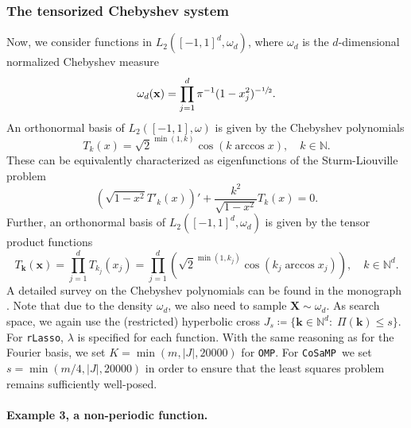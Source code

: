 \documentclass[11pt,reqno, a4paper]{article}
\numberwithin{equation}{section}
\newcommand{\N}{\mathbb{N}}
\newcommand{\rlasso}{\texttt{rLasso}}
\newcommand{\omp}{\texttt{OMP}}
\newcommand{\cosamp}{\texttt{CoSaMP}}
\begin{document}
\subsubsection{The tensorized Chebyshev system}
Now, we consider functions in $L_2([-1,1]^d, {\omega}_d)$, where $\omega_d$ is the $d$-dimensional normalized Chebyshev measure
\begin{equation}\label{prob_measure_Cheb}
\omega_d(\mathbf x) = \prod_{j=1}^d \pi^{-1}(1-x_j^2)^{-\sfrac12}.
\end{equation}
An orthonormal basis of $L_2([-1,1], {\omega})$ is given by the Chebyshev polynomials
\begin{equation}
    T_k(x) = \sqrt{2}^{\min(1, k)}
 \cos (k \arccos x), \quad k \in \N.
\end{equation}
These can be equivalently characterized as eigenfunctions of the Sturm-Liouville problem
\begin{equation}
    \left( \sqrt{1-x^2} T'_k(x) \right)' + \frac{k^2}{\sqrt{1-x^2}} T_k(x) = 0.
\end{equation}
Further, an orthonormal basis of $L_2([-1,1]^d, {\omega}_d)$ is given by the tensor product functions
\begin{equation}
    T_{\mathbf{k}} (\mathbf x) = \prod_{j=1}^{d} T_{k_j} (x_j)= \prod_{j=1}^{d} \left( \sqrt{2}^{\min(1, k_j)}
 \cos (k_j \arccos x_j) \right), \quad k \in \mathbb{N}^d.
\end{equation}
A detailed survey on the Chebyshev polynomials can be found in the monograph \cite{MasonHandscomb2003}.
Note that due to the density $\omega_d$, we also need to sample $\mathbf X \sim \omega_d$.
As search space, we again use the (restricted) hyperbolic cross $J_{s} \coloneqq \{\mathbf{k}\in\mathbb{N}^d\colon \; \Pi(\mathbf{k})\leq s\}$.
For \rlasso, $\lambda$ is specified for each function.
With the same reasoning as for the Fourier basis, we set $K=\min(m, \vert J \vert, 20000)$ for \omp.
For \cosamp \ we set $s = \min(m/4, \vert J \vert, 20000)$ in order to ensure that the least squares problem remains sufficiently well-posed.

\paragraph{Example 3, a non-periodic function.}
\end{document}
